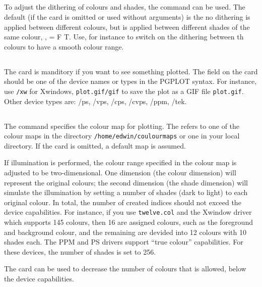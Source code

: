 \subsection{}
To adjust the dithering of colours and shades, the  command
can be used. The default (if the card is omitted or used without arguments)
is the no dithering is applied between different colours, but is applied
between different shades of the same colour, \ie, 
= F T. Use, for instance  to switch on the dithering
between th colours to have a smooth colour range.

\subsection{}
The card is manditory if you want to see something plotted. The
 field on the  card should be one of the
device names or types in the PGPLOT syntax. For instance, use
{\tt/xw} for Xwindows, {\tt plot.gif/gif} to save the plot as a GIF file
{\tt plot.gif}. Other device types are: /ps, /vps, /cps, /cvps, /ppm, /tek.

\subsection{}
The  command specifies the colour map for plotting.
The  refers to one of the colour maps in the directory
{\tt /home/edwin/coulourmaps} or one in your local directory. If the
card is omitted, a default map is assumed.

If illumination is performed, the colour range specified in the colour map
is adjusted to be two-dimensional. One dimension (the colour dimension)
will represent the original colours; the second dimension (the shade
dimension) will simulate the illumination by setting a number of shades
(dark to light) to each original colour. In total, the number of
created indices should not exceed the device capabilities. For instance,
if you use {\tt twelve.col} and
the Xwindow driver which supports 145 colours, then 16 are assigned colours,
such as the foreground and background colour, and the remaining are devided
into 12 colours with 10 shades each.
The PPM and PS drivers support ``true colour'' capabilities. For these
devices, the number of shades is set to 256.

The  card can be used to decrease the number of colours that
is allowed, below the device capabilities.

